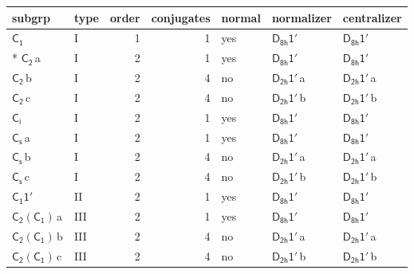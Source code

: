 \documentclass[10pt,a4paper]{article}
\numberwithin{equation}{section}
\newcommand{\grp}[1]{\mathsf{#1}}
\newcommand{\clsletter}[1]{\,{\scriptsize\color{black!55}#1}}
\begin{document}
{\small\begin{longtable}{@{}llrrlll@{}}\toprule
subgrp & type & order & conjugates & normal & normalizer & centralizer\\\midrule\endhead
\bottomrule\endfoot\endlastfoot
\href{../../../rotation/data/pdf/C1.pdf}{$\grp{C_{1}}$} & I & 1 & 1 & yes & \href{D8h-1p.pdf}{$\grp{D_{8h}1'}$} & \href{D8h-1p.pdf}{$\grp{D_{8h}1'}$}\\*
\href{../../../rotation/data/pdf/C2.pdf}{$\grp{C_{2}}$}\clsletter{a} & I & 2 & 1 & yes & \href{D8h-1p.pdf}{$\grp{D_{8h}1'}$} & \href{D8h-1p.pdf}{$\grp{D_{8h}1'}$}\\
\href{../../../rotation/data/pdf/C2.pdf}{$\grp{C_{2}}$}\clsletter{b} & I & 2 & 4 & no & \href{D2h-1p.pdf}{$\grp{D_{2h}1'}$}\clsletter{a} & \href{D2h-1p.pdf}{$\grp{D_{2h}1'}$}\clsletter{a}\\
\href{../../../rotation/data/pdf/C2.pdf}{$\grp{C_{2}}$}\clsletter{c} & I & 2 & 4 & no & \href{D2h-1p.pdf}{$\grp{D_{2h}1'}$}\clsletter{b} & \href{D2h-1p.pdf}{$\grp{D_{2h}1'}$}\clsletter{b}\\
\href{../../../rotation/data/pdf/S2.pdf}{$\grp{C_{i}}$} & I & 2 & 1 & yes & \href{D8h-1p.pdf}{$\grp{D_{8h}1'}$} & \href{D8h-1p.pdf}{$\grp{D_{8h}1'}$}\\
\href{../../../rotation/data/pdf/C1v.pdf}{$\grp{C_{s}}$}\clsletter{a} & I & 2 & 1 & yes & \href{D8h-1p.pdf}{$\grp{D_{8h}1'}$} & \href{D8h-1p.pdf}{$\grp{D_{8h}1'}$}\\
\href{../../../rotation/data/pdf/C1v.pdf}{$\grp{C_{s}}$}\clsletter{b} & I & 2 & 4 & no & \href{D2h-1p.pdf}{$\grp{D_{2h}1'}$}\clsletter{a} & \href{D2h-1p.pdf}{$\grp{D_{2h}1'}$}\clsletter{a}\\
\href{../../../rotation/data/pdf/C1v.pdf}{$\grp{C_{s}}$}\clsletter{c} & I & 2 & 4 & no & \href{D2h-1p.pdf}{$\grp{D_{2h}1'}$}\clsletter{b} & \href{D2h-1p.pdf}{$\grp{D_{2h}1'}$}\clsletter{b}\\
\href{C1-1p.pdf}{$\grp{C_{1}1'}$} & II & 2 & 1 & yes & \href{D8h-1p.pdf}{$\grp{D_{8h}1'}$} & \href{D8h-1p.pdf}{$\grp{D_{8h}1'}$}\\
\href{C2-C1.pdf}{$\grp{C_{2}}(\grp{C_{1}})$}\clsletter{a} & III & 2 & 1 & yes & \href{D8h-1p.pdf}{$\grp{D_{8h}1'}$} & \href{D8h-1p.pdf}{$\grp{D_{8h}1'}$}\\
\href{C2-C1.pdf}{$\grp{C_{2}}(\grp{C_{1}})$}\clsletter{b} & III & 2 & 4 & no & \href{D2h-1p.pdf}{$\grp{D_{2h}1'}$}\clsletter{a} & \href{D2h-1p.pdf}{$\grp{D_{2h}1'}$}\clsletter{a}\\
\href{C2-C1.pdf}{$\grp{C_{2}}(\grp{C_{1}})$}\clsletter{c} & III & 2 & 4 & no & \href{D2h-1p.pdf}{$\grp{D_{2h}1'}$}\clsletter{b} & \href{D2h-1p.pdf}{$\grp{D_{2h}1'}$}\clsletter{b}\\

\end{longtable}}
\end{document}
